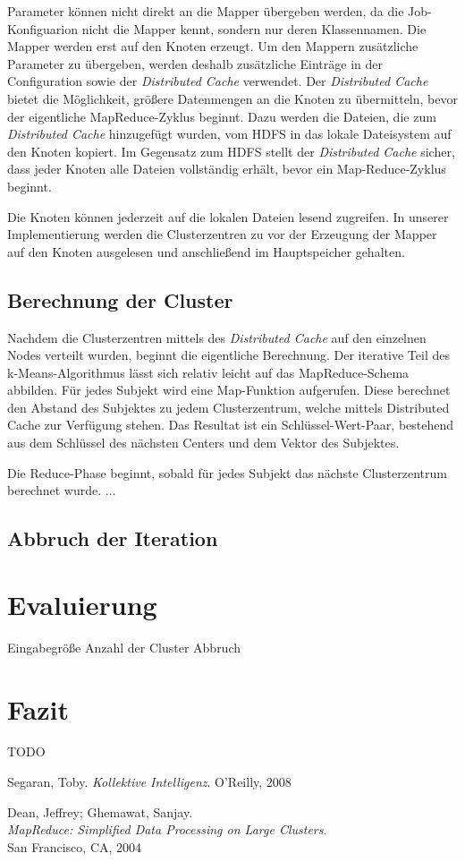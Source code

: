 \documentclass[a4paper]{llncs}
\begin{document}
Parameter können nicht direkt an die Mapper übergeben werden, da die Job-Konfiguarion nicht die Mapper kennt, sondern nur deren Klassennamen. Die Mapper werden erst auf den Knoten erzeugt. Um den Mappern zusätzliche Parameter zu übergeben, werden deshalb zusätzliche Einträge in der Configuration sowie der \emph{Distributed Cache} verwendet. Der \emph{Distributed Cache} bietet die Möglichkeit, größere Datenmengen an die Knoten zu übermitteln, bevor der eigentliche MapReduce-Zyklus beginnt. Dazu werden die Dateien, die zum \emph{Distributed Cache} hinzugefügt wurden, vom HDFS in das lokale Dateisystem auf den Knoten kopiert. Im Gegensatz zum HDFS stellt der \emph{Distributed Cache} sicher, dass jeder Knoten alle Dateien vollständig erhält, bevor ein Map-Reduce-Zyklus beginnt.

Die Knoten können jederzeit auf die lokalen Dateien lesend zugreifen. In unserer Implementierung werden die Clusterzentren zu vor der Erzeugung der Mapper auf den Knoten ausgelesen und anschließend im Hauptspeicher gehalten.

\subsection{Berechnung der Cluster}

Nachdem die Clusterzentren mittels des \emph{Distributed Cache} auf den einzelnen Nodes verteilt wurden, beginnt die eigentliche Berechnung. Der iterative Teil des k-Means-Algorithmus lässt sich relativ leicht auf das MapReduce-Schema abbilden. Für jedes Subjekt wird eine Map-Funktion aufgerufen. Diese berechnet den Abstand des Subjektes zu jedem Clusterzentrum, welche mittels Distributed Cache zur Verfügung stehen. Das Resultat ist ein Schlüssel-Wert-Paar, bestehend aus dem Schlüssel des nächsten Centers und dem Vektor des Subjektes.

Die Reduce-Phase beginnt, sobald für jedes Subjekt das nächste Clusterzentrum berechnet wurde. ...

\subsection{Abbruch der Iteration}

\section{Evaluierung}
Eingabegröße
Anzahl der Cluster
Abbruch

\section{Fazit}
TODO

\begin{thebibliography}{------------}

  Segaran, Toby.
  {\em Kollektive Intelligenz}.
  O'Reilly, 2008

  Dean, Jeffrey; Ghemawat, Sanjay.\\
  {\em MapReduce: Simplified Data Processing on Large Clusters}.\\
  San Francisco, CA, 2004
   
\end{thebibliography}
\end{document}
